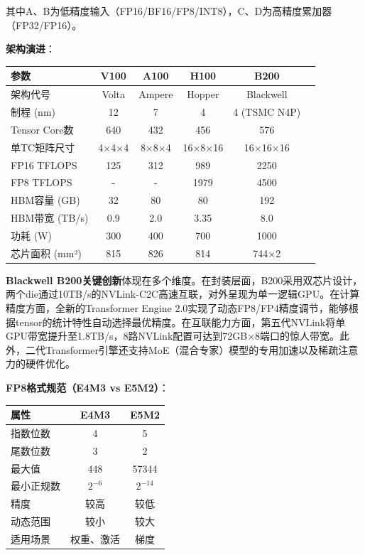 其中A、B为低精度输入（FP16/BF16/FP8/INT8），C、D为高精度累加器（FP32/FP16）。

\textbf{架构演进}：

\begin{table}[H]
\centering
\small
\begin{tabular}{lccccc}
\toprule
\textbf{参数} & \textbf{V100} & \textbf{A100} & \textbf{H100} & \textbf{B200} \\
\midrule
架构代号 & Volta & Ampere & Hopper & Blackwell \\
制程 (nm) & 12 & 7 & 4 & 4 (TSMC N4P) \\
Tensor Core数 & 640 & 432 & 456 & 576 \\
单TC矩阵尺寸 & 4×4×4 & 8×8×4 & 16×8×16 & 16×16×16 \\
FP16 TFLOPS & 125 & 312 & 989 & 2250 \\
FP8 TFLOPS & - & - & 1979 & 4500 \\
HBM容量 (GB) & 32 & 80 & 80 & 192 \\
HBM带宽 (TB/s) & 0.9 & 2.0 & 3.35 & 8.0 \\
功耗 (W) & 300 & 400 & 700 & 1000 \\
芯片面积 (mm²) & 815 & 826 & 814 & 744×2 \\
\bottomrule
\end{tabular}
\end{table}

\textbf{Blackwell B200关键创新}体现在多个维度。在封装层面，B200采用双芯片设计，两个die通过10TB/s的NVLink-C2C高速互联，对外呈现为单一逻辑GPU。在计算精度方面，全新的Transformer Engine 2.0实现了动态FP8/FP4精度调节，能够根据tensor的统计特性自动选择最优精度。在互联能力方面，第五代NVLink将单GPU带宽提升至1.8TB/s，8路NVLink配置可达到72GB×8端口的惊人带宽。此外，二代Transformer引擎还支持MoE（混合专家）模型的专用加速以及稀疏注意力的硬件优化。

\textbf{FP8格式规范（E4M3 vs E5M2）}：

\begin{table}[H]
\centering
\small
\begin{tabular}{lcc}
\toprule
\textbf{属性} & \textbf{E4M3} & \textbf{E5M2} \\
\midrule
指数位数 & 4 & 5 \\
尾数位数 & 3 & 2 \\
最大值 & 448 & 57344 \\
最小正规数 & $2^{-6}$ & $2^{-14}$ \\
精度 & 较高 & 较低 \\
动态范围 & 较小 & 较大 \\
适用场景 & 权重、激活 & 梯度 \\
\bottomrule
\end{tabular}
\end{table}

